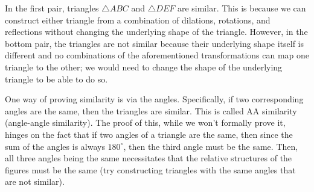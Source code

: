 \begin{center}
\end{center}

In the first pair, triangles $\triangle ABC$ and $\triangle DEF$ are similar. This is because we can construct either triangle from a combination of dilations, rotations, and reflections without changing the underlying shape of the triangle. However, in the bottom pair, the triangles are not similar because their underlying shape itself is different and no combinations of the aforementioned transformations can map one triangle to the other; we would need to change the shape of the underlying triangle to be able to do so. 

One way of proving similarity is via the angles. Specifically, if two corresponding angles are the same, then the triangles are similar. This is called AA similarity (angle-angle similarity). The proof of this, while we won't formally prove it, hinges on the fact that if two angles of a triangle are the same, then since the sum of the angles is always $180^\circ$, then the third angle must be the same. Then, all three angles being the same necessitates that the relative structures of the figures must be the same (try constructing triangles with the same angles that are not similar). 

